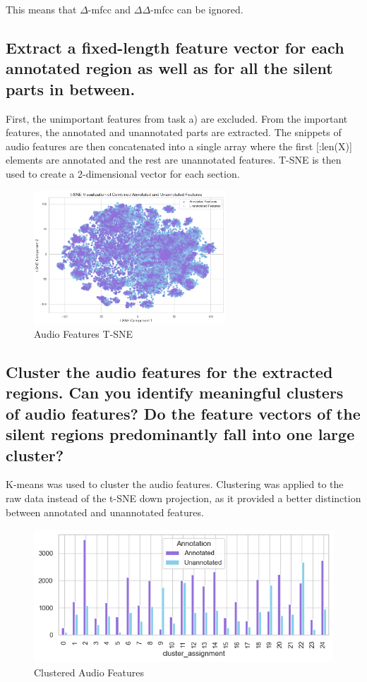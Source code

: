 This means that $\Delta$-mfcc and $\Delta\Delta$-mfcc can be ignored.

\subsection{Extract a fixed-length feature vector for each annotated region as well as for all the silent parts in between. }
\label{sec:Audio Features:b}

First, the unimportant features from task a) are excluded. From the important features, the annotated and unannotated parts are extracted.
The snippets of audio features are then concatenated into a single array where the first [:len(X)] elements are annotated and the rest are unannotated features. T-SNE is then used to create a 2-dimensional vector for each section.


\begin{figure}[htbp]
    \centering
    \includegraphics[width=0.5\linewidth, height=5cm]{figs/Audio Features T-SNE.png}
    \caption{Audio Features T-SNE}
    \label{fig:Audio Features T-SNE}
\end{figure}


\subsection{Cluster the audio features for the extracted regions. Can you identify meaningful clusters of audio features? Do the feature vectors of the silent regions predominantly fall into one large cluster?}
\label{sec:Audio Features:c}

K-means was used to cluster the audio features. Clustering was applied to the raw data instead of the t-SNE down projection, as it provided a better distinction between annotated and unannotated features.

\pagebreak

\begin{figure}[htbp]
    \centering
    \includegraphics[width=0.5\linewidth, height=5cm]{figs/Clustered Audio Features.png}
    \caption{Clustered Audio Features}
    \label{fig:Clustered Audio Features}
\end{figure}

